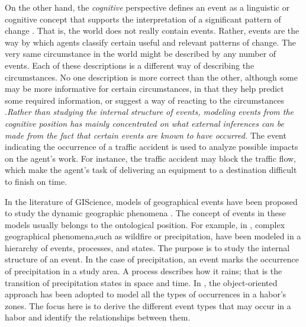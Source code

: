 On the other hand, the \emph{cognitive} perspective defines an event as a linguistic or cognitive concept that supports the interpretation of a significant pattern of change \cite{allen1994actions}. That is, the world does not really contain events. Rather, events are the way by which agents classify certain useful and relevant patterns of change. The very same circumstance in the world might be described by any number of events. Each of these descriptions is a different way of describing the circumstances. No one description is more correct than the other, although some may be more informative for certain circumstances, in that they help predict some required information, or suggest a way of reacting to the circumstances \cite{allen1994actions}.\emph{Rather than studying the internal structure of events, modeling events from the cognitive position has mainly concentrated on what external inferences can be made from the fact that certain events are known to have occurred.} The event indicating the occurrence of a traffic accident is used to analyze possible impacts on the agent's work. For instance, the traffic accident may block the traffic flow, which make the agent's task of delivering an equipment to a destination difficult to finish on time. 

In the literature of GIScience, models of geographical events have been proposed to study the dynamic geographic phenomena \cite{worboys2005a}. The concept of events in these models usually belongs to the ontological position. For example, in \cite{YuanApril20011523-0406-83}, complex geographical phenomena,such as wildfire or precipitation, have been modeled in a hierarchy of events, processes, and states. The purpose is to study the internal structure of an event. In the case of precipitation, an event marks the occurrence of precipitation in a study area. A process describes how it rains; that is the transition of precipitation states in space and time. In \cite{rodriguez2005a}, the object-oriented approach has been adopted to model all the types of occurrences in a habor's zones. The focus here is to derive the different event types that may occur in a habor and identify the relationships between them.   

